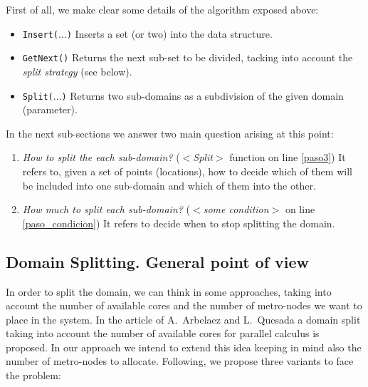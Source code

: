 First of all, we make clear some details of the algorithm exposed above:

\begin{itemize}
\item \texttt{Insert($\dots$)} Inserts a set (or two) into the data structure. %
\item \texttt{GetNext()} Returns the next sub-set to be divided, tacking into account the {\it split strategy} (see below).
\item \texttt{Split($\dots$)} Returns two sub-domains as a subdivision of the given domain (parameter).
\end{itemize}

In the next sub-sections we answer two main question arising at this point:

\begin{enumerate}
\item \textit{How to split the each sub-domain?} ($<$\emph{Split}$>$ function on line \ref{paso3}) It refers to, given a set of points (locations), how to decide which of them will be included into one sub-domain and which of them into the other.
\item \textit{How much to split each sub-domain?} ($<$\emph{some condition}$>$ on line \ref{paso_condicion}) It refers to decide when to stop splitting the domain.
\end{enumerate}

\subsection{Domain Splitting. General point of view}

In order to split the domain, we can think in some approaches, taking into account the number of available cores and the number of metro-nodes we want to place in the system. In the article of A.~Arbelaez and L.~Quesada a domain split taking into account the number of available cores for parallel calculus is proposed. In our approach we intend to extend this idea keeping in mind also the number of metro-nodes to allocate. Following, we propose three variants to face the problem:


